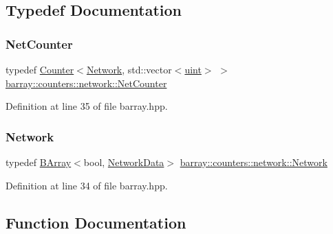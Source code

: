 \subsection{Typedef Documentation}
\mbox{\label{namespacebarray_1_1counters_1_1network_a0246d66b7032c9d44a10d4fd025e1ac5}} 
\subsubsection{\texorpdfstring{Net\+Counter}{NetCounter}}
{\footnotesize\ttfamily typedef \hyperlink{classbarray_1_1_counter}{Counter}$<$\hyperlink{namespacebarray_1_1counters_1_1network_a29d413c01033d40f81dcbe014b40498c}{Network}, std\+::vector$<$\hyperlink{namespacebarray_af9756a31953db233f80a9cfe1ef31c32}{uint}$>$ $>$ \hyperlink{namespacebarray_1_1counters_1_1network_a0246d66b7032c9d44a10d4fd025e1ac5}{barray\+::counters\+::network\+::\+Net\+Counter}}



Definition at line 35 of file barray.\+hpp.

\mbox{\label{namespacebarray_1_1counters_1_1network_a29d413c01033d40f81dcbe014b40498c}} 
\subsubsection{\texorpdfstring{Network}{Network}}
{\footnotesize\ttfamily typedef \hyperlink{classbarray_1_1_b_array}{B\+Array}$<$bool, \hyperlink{classbarray_1_1counters_1_1network_1_1_network_data}{Network\+Data}$>$ \hyperlink{namespacebarray_1_1counters_1_1network_a29d413c01033d40f81dcbe014b40498c}{barray\+::counters\+::network\+::\+Network}}



Definition at line 34 of file barray.\+hpp.



\subsection{Function Documentation}
\mbox{\label{namespacebarray_1_1counters_1_1network_a8f8a6f06ceb0b6e870190ab45efaf014}} 
